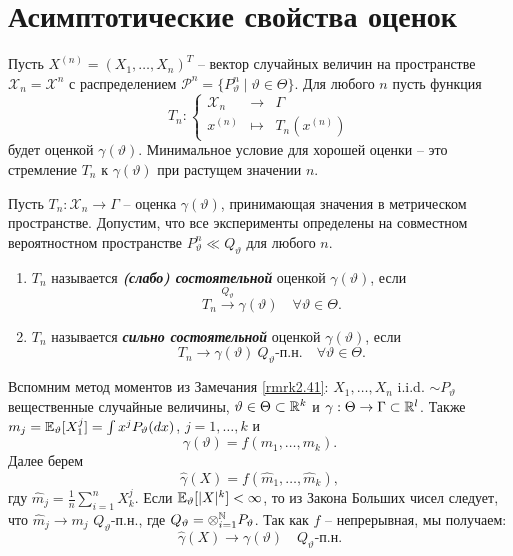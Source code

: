 \graphicspath{{./chapters/chapter05/}}
\chapter{Асимптотические свойства оценок}

Пусть $X^{(n)}=(X_1, \dots, X_n)^T$ -- вектор случайных величин на пространстве $\mathcal{X}_n=\mathcal{X}^n$ с распределением $\mathcal{P}^n=\{P_\vartheta^n \mid \vartheta \in \Theta \} $. Для любого $n$ пусть функция
\[ T_n :
\left \{
\begin{array}{ccl}
\mathcal{X}_n & \rightarrow & \Gamma \\
x^{(n)} & \mapsto & T_n(x^{(n)})  
\end{array}
\right.
\]
будет оценкой $\gamma(\vartheta)$. Минимальное условие для хорошей оценки -- это стремление $T_n$ к $\gamma(\vartheta)$ при растущем значении $n$.

\begin{defn}
	Пусть $T_n:\mathcal{X}_n \rightarrow \Gamma$ -- оценка $\gamma(\vartheta)$, принимающая значения в метрическом пространстве. Допустим, что все эксперименты определены на совместном вероятностном пространстве $P_\vartheta^n \ll Q_\vartheta$ для любого $n$.
	\begin{enumerate}
		\item $T_n$ называется \textbf{\textit{(слабо) состоятельной}} оценкой $\gamma(\vartheta)$, если 
		\[ T_n \xrightarrow{Q_\vartheta}\gamma(\vartheta) \quad \forall \vartheta \in \Theta. \]
		\item $T_n$ называется \textbf{\textit{сильно состоятельной}} оценкой $\gamma(\vartheta)$, если 
		\[ T_n \rightarrow \gamma(\vartheta) \ Q_\vartheta\text{-п.н.} \quad \forall \vartheta \in \Theta. \]
	\end{enumerate} 
\end{defn}

\begin{exmp} \label{exmp5.2}
	Вспомним метод моментов из Замечания \ref{rmrk2.41}: $X_1, \dots, X_n$ i.i.d. $\sim P_\vartheta$ вещественные случайные величины, $\vartheta \in \Theta \subset \mathbb{R}^k$ и $\gamma : \Theta \rightarrow \Gamma \subset \mathbb{R}^l$. Также $m_j = \mathbb{E}_\vartheta[X_1^j] = \int x^j P_\vartheta(dx)$, $j = 1, \dots, k$ и 
	\[\gamma(\vartheta) = f(m_1, \dots, m_k).\]
	Далее берем
	\[ \hat{\gamma}(X) = f(\hat{m}_1, \dots, \hat{m}_k), \]
	гду $\hat{m}_j = \frac{1}{n} \sum_{i=1}^{n}X_k^j$. Если $\mathbb{E}_\vartheta[|X|^k] < \infty$, то из Закона Больших чисел следует, что $\hat{m}_j \rightarrow m_j$ $Q_\vartheta$-п.н., где $Q_\vartheta = \otimes_{i=1}^{\mathbb{N}} P_\vartheta$. Так как $f$ -- непрерывная, мы получаем:
	\[ \hat{\gamma}(X) \rightarrow \gamma(\vartheta) \quad Q_\vartheta\text{-п.н.}\]
\end{exmp}

